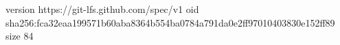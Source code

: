 version https://git-lfs.github.com/spec/v1
oid sha256:fca32eaa199571b60aba8364b554ba0784a791da0e2ff97010403830e152ff89
size 84

